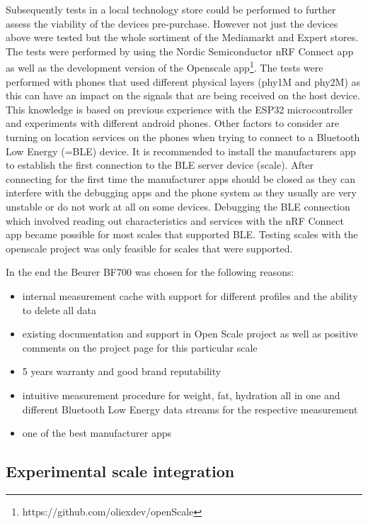 Subsequently tests in a local technology store could be performed to further assess the viability of the devices pre-purchase. However not just the devices above were tested but the whole sortiment of the Mediamarkt and Expert stores. The tests were performed by using the Nordic Semiconductor nRF Connect app as well as the development version of the Openscale app\footnote{https://github.com/oliexdev/openScale}. The tests were performed with phones that used different physical layers (phy1M and phy2M) as this can have an impact on the signals that are being received on the host device. This knowledge is based on previous experience with the ESP32 microcontroller and experiments with different android phones. Other factors to consider are turning on location services on the phones when trying to connect to a Bluetooth Low Energy (=BLE) device. It is recommended to install the manufacturers app to establish the first connection to the BLE server device (scale). After connecting for the first time the manufacturer apps should be closed as they can interfere with the debugging apps and the phone system as they usually are very unstable or do not work at all on some devices. Debugging the BLE connection which involved reading out characteristics and services with the nRF Connect app became possible for most scales that supported BLE. Testing scales with the openscale project was only feasible for scales that were supported. 

In the end the Beurer BF700 was chosen for the following reasons:

\begin{itemize}
	\item internal measurement cache with support for different profiles and the ability to delete all data

	\item existing documentation and support in Open Scale project as well as positive comments on the project page for this particular scale

	\item 5 years warranty and good brand reputability

	\item intuitive measurement procedure for weight, fat, hydration all in one and different Bluetooth Low Energy data streams for the respective measurement

	\item one of the best manufacturer apps
\end{itemize}

\subsection{Experimental scale integration}

